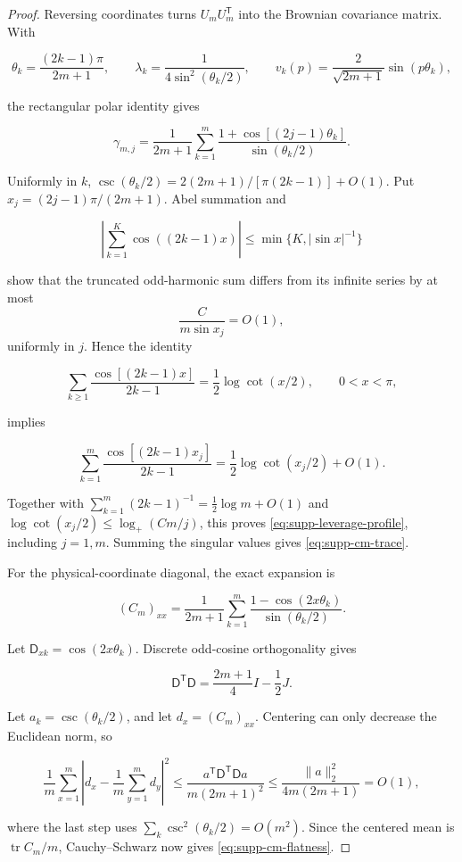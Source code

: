 \begin{proof}
Reversing coordinates turns \(U_mU_m^{\mathsf T}\) into the Brownian
covariance matrix.  With

\[
 \theta_k=\frac{(2k-1)\pi}{2m+1},
 \qquad
 \lambda_k=\frac1{4\sin^2(\theta_k/2)},
 \qquad
 v_k(p)=\frac{2}{\sqrt{2m+1}}\sin(p\theta_k),
\]

the rectangular polar identity gives

\begin{equation}\label{eq:supp-leverage-cosine-formula}
 \gamma_{m,j}=\frac1{2m+1}\sum_{k=1}^m
 \frac{1+\cos[(2j-1)\theta_k]}{\sin(\theta_k/2)}.
\end{equation}

Uniformly in \(k\),
\(\csc(\theta_k/2)=2(2m+1)/[\pi(2k-1)]+O(1)\).  Put
\(x_j=(2j-1)\pi/(2m+1)\).  Abel summation and

\[
 \left|\sum_{k=1}^K\cos((2k-1)x)\right|
 \le \min\{K,|\sin x|^{-1}\}
\]

show that the truncated odd-harmonic sum differs from its infinite series by
at most
\[
 \frac{C}{m\sin x_j}=O(1),
\]
uniformly in \(j\).  Hence the identity

\[
 \sum_{k\ge1}\frac{\cos[(2k-1)x]}{2k-1}
 =\frac12\log\cot(x/2),\qquad0<x<\pi,
\]

implies

\[
 \sum_{k=1}^m\frac{\cos[(2k-1)x_j]}{2k-1}
 =\frac12\log\cot(x_j/2)+O(1).
\]

Together with
\(\sum_{k=1}^m(2k-1)^{-1}=\tfrac12\log m+O(1)\) and
\(\log\cot(x_j/2)\le\log_+(Cm/j)\), this proves
\eqref{eq:supp-leverage-profile}, including \(j=1,m\).  Summing the singular
values gives
\eqref{eq:supp-cm-trace}.

For the physical-coordinate diagonal, the exact expansion is

\begin{equation}\label{eq:supp-cm-diagonal-expansion}
 (C_m)_{xx}=\frac1{2m+1}\sum_{k=1}^m
 \frac{1-\cos(2x\theta_k)}{\sin(\theta_k/2)}.
\end{equation}

Let \(\mathsf D_{xk}=\cos(2x\theta_k)\).  Discrete odd-cosine
orthogonality gives

\begin{equation}\label{eq:supp-odd-cosine-gram}
 \mathsf D^{\mathsf T}\mathsf D
 =\frac{2m+1}{4}I-\frac12J.
\end{equation}

Let \(a_k=\csc(\theta_k/2)\), and let \(d_x=(C_m)_{xx}\).  Centering can only
decrease the Euclidean norm, so

\[
 \frac1m\sum_{x=1}^m\left|d_x-\frac1m\sum_{y=1}^md_y\right|^2
 \le
 \frac{a^{\mathsf T}\mathsf D^{\mathsf T}\mathsf D a}
 {m(2m+1)^2}
 \le\frac{\|a\|_2^2}{4m(2m+1)}=O(1),
\]

where the last step uses
\(\sum_k\csc^2(\theta_k/2)=O(m^2)\).  Since the centered mean is
\(\operatorname{tr}C_m/m\), Cauchy--Schwarz now gives
\eqref{eq:supp-cm-flatness}.
\end{proof}

